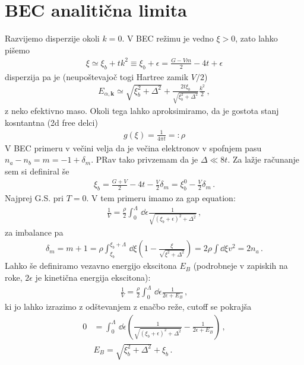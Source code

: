 \documentclass[a4paper,10pt]{article}
\renewcommand{\vec}[1]{\mathbf{#1}}
\begin{document}
\FloatBarrier
\section{BEC analitična limita}
Razvijemo disperzije okoli $k=0$. V BEC režimu je vedno $\xi>0$, zato lahko pišemo 
\begin{align}
  \xi \simeq \xi_b + tk^2 \equiv \xi_b + \epsilon = \frac{G-Vm}{2} - 4t + \epsilon 
\end{align}
disperzija pa je (neupoštevajoč togi Hartree zamik $V/2$) 
\begin{align}
  E_{\alpha, \vec{k}} \simeq \sqrt{\xi_b^2 + \Delta^2} + \frac{2t\xi_b}{\sqrt{\xi_b^2 + \Delta^2}} \frac{k^2}{2}\,,
\end{align}
z neko efektivno maso. Okoli tega lahko aproksimiramo, da je gostota stanj kosntantna (2d free delci)
\begin{align}
  g(\xi) = \frac{1}{4\pi t} =:\rho
\end{align}
V BEC primeru v večini velja da je večina elektronov v spofnjem pasu $n_a - n_b = m=-1+\delta_m$. PRav tako privzemam da je $\Delta \ll 8t$. Za lažje računanje sem si definiral še 
\begin{align}
  \xi_b = \frac{G+V}{2}-4t -\frac{V}{2}\delta_m = \xi_b^0 -\frac{V}{2}\delta_m \,.
\end{align}
Najprej G.S. pri $T=0$. V tem primeru imamo za gap equation: 
\begin{align}
  \frac{1}{V} = \frac{\rho}{2} \int_{0}^{\Lambda} \,\dd{\epsilon}\frac{1}{\sqrt{(\xi_b+\epsilon)^2+\Delta^2}}\,,
\end{align}
za imbalance pa 
\begin{align}
  \delta_m = m+1 = \rho \int_{\xi_b}^{\xi_b + \Lambda} \,\dd{\xi} \left(1-\frac{\xi}{\sqrt{\xi^2 + \Delta^2}}\right) = 2\rho \int \dd{\xi} v^2 = 2n_a\,.
\end{align}
Lahko še definiramo vezavno energijo ekscitona $E_B$ (podrobneje v zapiskih na roke, $2\epsilon$ je kinetična energija ekscitona): 
\begin{align}
  \frac{1}{V} = \frac{\rho}{2} \int_{0}^{\Lambda} \,\dd{\epsilon}\frac{1}{2\epsilon + E_B}\,,
\end{align}
ki jo lahko izrazimo z odštevanjem z enačbo reže, cutoff se pokrajša 
\begin{align}
  0 &= \int_{0}^{\Lambda} \,\dd{\epsilon} \left(\frac{1}{\sqrt{(\xi_b+\epsilon)^2+\Delta^2}} - \frac{1}{2\epsilon + E_B}\right) \,, \nonumber\\
  &E_B = \sqrt{\xi_b^2+\Delta^2} + \xi_b\,.
\end{align}
\end{document}
